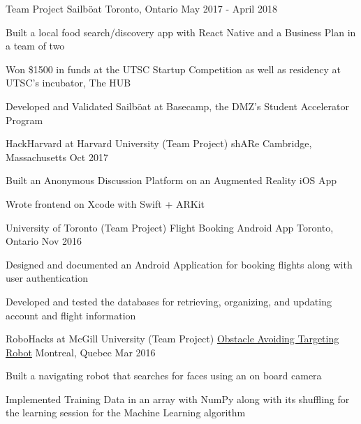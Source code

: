 \begin{cventries}
\cventry
    {Team Project}
    {Sailböat}
    {Toronto, Ontario}
    {May 2017 - April 2018}
    {
      \begin{cvitems}
        \item {Built a local food search/discovery app with React Native and a Business Plan in a team of two}
        \item {Won \$1500 in funds at the UTSC Startup Competition as well as residency at UTSC's incubator, The HUB}
        \item {Developed and Validated Sailböat at Basecamp, the DMZ's Student Accelerator Program}
      \end{cvitems}
    }
\cventry
    {HackHarvard at Harvard University (Team Project)}
    {shARe}
    {Cambridge, Massachusetts}
    {Oct 2017}
    {
      \begin{cvitems}
        \item {Built an Anonymous Discussion Platform on an Augmented Reality iOS App}
        \item {Wrote frontend on Xcode with Swift + ARKit}
      \end{cvitems}
    }
\cventry
    {University of Toronto (Team Project)}
    {Flight Booking Android App}
    {Toronto, Ontario}
    {Nov 2016}
    {
      \begin{cvitems}
        \item {Designed and documented an Android Application for booking flights along with user authentication}
        \item {Developed and tested the databases for retrieving, organizing, and updating account and flight information}
      \end{cvitems}
    }
\cventry
    {RoboHacks at McGill University (Team Project)}
    {\href{https://github.com/PhABC/HeadHunterBots}{Obstacle Avoiding Targeting Robot}}
    {Montreal, Quebec}
    {Mar 2016}
    {
      \begin{cvitems}
        \item {Built a navigating robot that searches for faces using an on board camera}
        \item {Implemented Training Data in an array with NumPy along with its shuffling for the learning session for the Machine Learning algorithm}
      \end{cvitems}
    }
\end{cventries}
